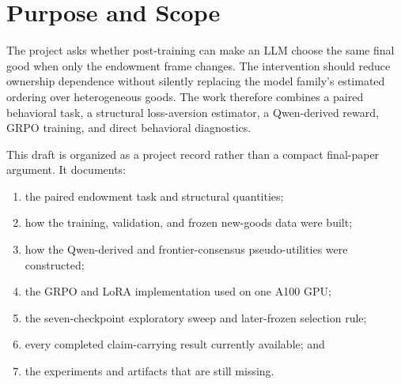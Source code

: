 \documentclass[11pt,letterpaper]{article}
\begin{document}
\tableofcontents
\listoffigures
\listoftables
\newpage

\section{Purpose and Scope}

The project asks whether post-training can make an LLM choose the same final
good when only the endowment frame changes. The intervention should reduce
ownership dependence without silently replacing the model family's estimated
ordering over heterogeneous goods. The work therefore combines a paired
behavioral task, a structural loss-aversion estimator, a Qwen-derived reward,
GRPO training, and direct behavioral diagnostics.

This draft is organized as a project record rather than a compact final-paper
argument. It documents:
\begin{enumerate}
    \item the paired endowment task and structural quantities;
    \item how the training, validation, and frozen new-goods data were built;
    \item how the Qwen-derived and frontier-consensus pseudo-utilities were
          constructed;
    \item the GRPO and LoRA implementation used on one A100 GPU;
    \item the seven-checkpoint exploratory sweep and later-frozen selection
          rule;
    \item every completed claim-carrying result currently available; and
    \item the experiments and artifacts that are still missing.
\end{enumerate}
\end{document}
